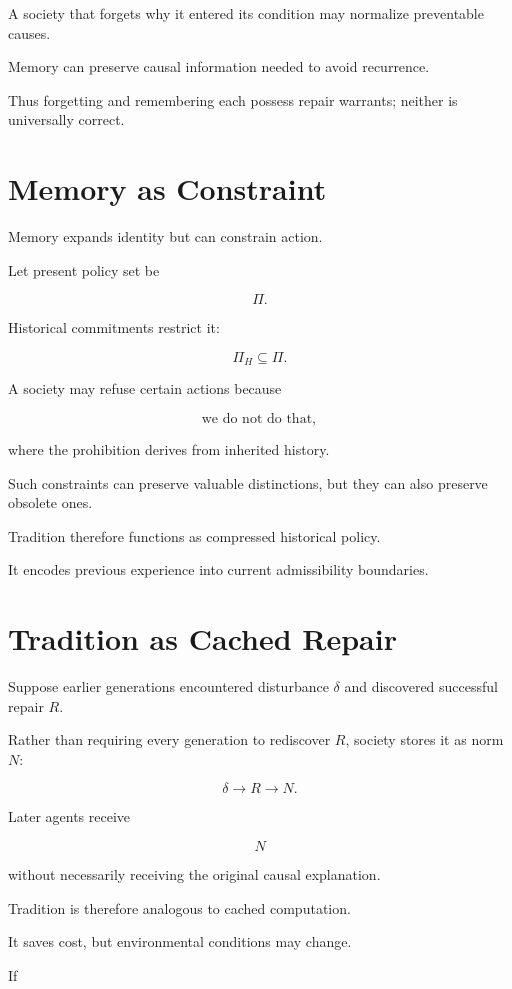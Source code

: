 \documentclass[11pt,oneside]{book}
\theoremstyle{definition}
\theoremstyle{remark}
\begin{document}
A society that forgets why it entered its condition may normalize preventable causes.

Memory can preserve causal information needed to avoid recurrence.

Thus forgetting and remembering each possess repair warrants; neither is universally correct.

\section{Memory as Constraint}

Memory expands identity but can constrain action.

Let present policy set be

\[
\Pi.
\]

Historical commitments restrict it:

\[
\Pi_H
\subseteq
\Pi.
\]

A society may refuse certain actions because

\[
\text{we do not do that},
\]

where the prohibition derives from inherited history.

Such constraints can preserve valuable distinctions, but they can also preserve obsolete ones.

Tradition therefore functions as compressed historical policy.

It encodes previous experience into current admissibility boundaries.

\section{Tradition as Cached Repair}

Suppose earlier generations encountered disturbance \(\delta\) and discovered successful repair \(R\).

Rather than requiring every generation to rediscover \(R\), society stores it as norm \(N\):

\[
\delta
\rightarrow
R
\rightarrow
N.
\]

Later agents receive

\[
N
\]

without necessarily receiving the original causal explanation.

Tradition is therefore analogous to cached computation.

It saves cost, but environmental conditions may change.

If
\end{document}
